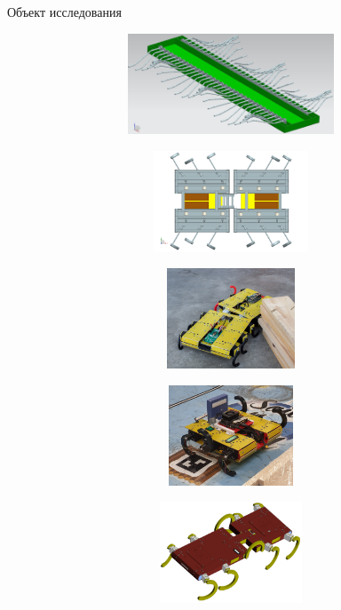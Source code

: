 \documentclass[aspectratio=169,xcolor=table,10pt]{beamer}
\begin{document}
\begin{frame}{Объект исследования}
    \vspace{-0.3cm}
    \begin{figure}[H]
        \begin{subfigure}{0.32\textwidth}
        \centering\includegraphics[height=3cm,width=1\textwidth,keepaspectratio]{strirus_0.png}
        \end{subfigure}
        \begin{subfigure}{0.32\textwidth}
            \centering\includegraphics[height=3cm,width=1\textwidth,keepaspectratio]{strirus_1.png}
        \end{subfigure}
        \begin{subfigure}{0.32\textwidth}
            \centering\includegraphics[height=3cm,width=1\textwidth,keepaspectratio]{strirus_2.jpg}
        \end{subfigure}

        \begin{subfigure}{0.32\textwidth}
            \centering\includegraphics[height=3cm,width=1\textwidth,keepaspectratio]{strirus_3.JPG}
        \end{subfigure}
        \begin{subfigure}{0.32\textwidth}
            \centering\includegraphics[height=3cm,width=1\textwidth,keepaspectratio]{strirus_4.png}
        \end{subfigure}
  \end{figure}
\end{frame}
\end{document}
